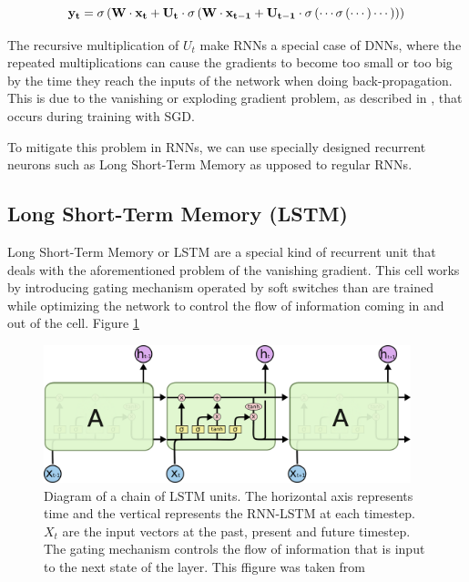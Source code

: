 \begin{equation}
    \centering
    \mathbf{y_t} = \sigma \left ( \mathbf{W} \cdot \mathbf{x_t} + \mathbf{U_t} \cdot \sigma \left ( \mathbf{W} \cdot \mathbf{x_{t-1}} + \mathbf{U_{t-1}} \cdot \sigma \left ( \cdots \sigma \left ( \cdots \right ) \cdots \right ) \right ) \right )
    \label{eq:out-rec-expanded}
\end{equation}

The recursive multiplication of $U_t$ make RNNs a special case of DNNs, where the repeated multiplications can cause the gradients to become too small or too big by the time they reach the inputs of the network when doing back-propagation. This is due to the vanishing or exploding gradient problem, as described in \cite{bengio1994learning}, that occurs during training with SGD.

To mitigate this problem in RNNs, we can use specially designed recurrent neurons such as Long Short-Term Memory as upposed to regular RNNs.

\subsection{Long Short-Term Memory (LSTM)}

Long Short-Term Memory \cite{hochreiter1997long} or LSTM are a special kind of recurrent unit that deals with the aforementioned problem of the vanishing gradient. This cell works by introducing gating mechanism operated by soft switches than are trained while optimizing the network to control the flow of information coming in and out of the cell. Figure \ref{fig:lstm}

\begin{figure}[h]
    \centering
    \includegraphics[height=4cm]{figures/lstm-chain}
    \caption{Diagram of a chain of LSTM units. The horizontal axis represents time and the vertical represents the RNN-LSTM at each timestep. $X_t$ are the input vectors at the past, present and future timestep. The gating mechanism controls the flow of information that is input to the next state of the layer. This ffigure was taken from \cite{lstm}}
    \label{fig:lstm}
\end{figure}

